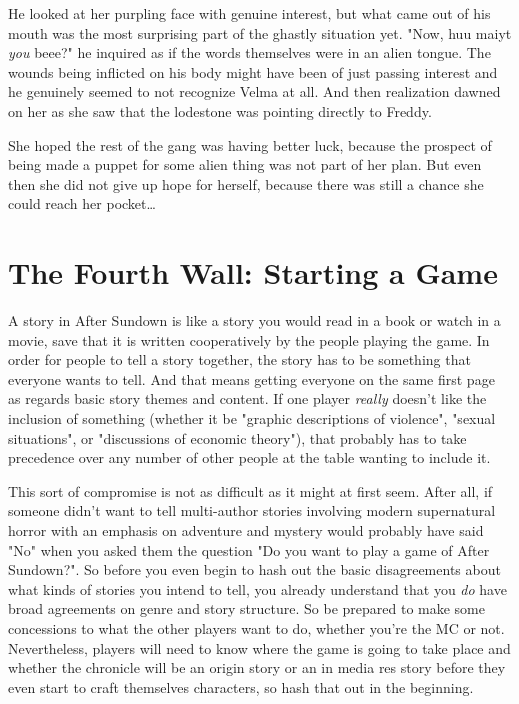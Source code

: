 He looked at her purpling face with genuine interest, but what came out of his mouth was the most surprising part of the ghastly situation yet. "Now, huu maiyt \textit{you} beee?" he inquired as if the words themselves were in an alien tongue. The wounds being inflicted on his body might have been of just passing interest and he genuinely seemed to not recognize Velma at all. And then realization dawned on her as she saw that the lodestone was pointing directly to Freddy.

She hoped the rest of the gang was having better luck, because the prospect of being made a puppet for some alien thing was not part of her plan. But even then she did not give up hope for herself, because there was still a chance she could reach her pocket\ldots{}

\section[The Fourth Wall]{The Fourth Wall: Starting a Game}

\hspace{\parindent} A story in After Sundown is like a story you would read in a book or watch in a movie, save that it is written cooperatively by the people playing the game. In order for people to tell a story together, the story has to be something that everyone wants to tell. And that means getting everyone on the same first page as regards basic story themes and content. If one player \textit{really} doesn't like the inclusion of something (whether it be "graphic descriptions of violence", "sexual situations", or "discussions of economic theory"), that probably has to take precedence over any number of other people at the table wanting to include it.

This sort of compromise is not as difficult as it might at first seem. After all, if someone didn't want to tell multi-author stories involving modern supernatural horror with an emphasis on adventure and mystery would probably have said "No" when you asked them the question "Do you want to play a game of After Sundown?". So before you even begin to hash out the basic disagreements about what kinds of stories you intend to tell, you already understand that you \textit{do} have broad agreements on genre and story structure. So be prepared to make some concessions to what the other players want to do, whether you're the MC or not. Nevertheless, players will need to know where the game is going to take place and whether the chronicle will be an origin story or an in media res story before they even start to craft themselves characters, so hash that out in the beginning.

